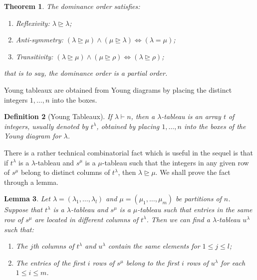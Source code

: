\documentclass{assignment}[2019/10/15]
\theoremstyle{plain}
\newtheorem{theorem}{Theorem}[section]
\newtheorem{definition}[theorem]{Definition}
\newtheorem{lemma}[theorem]{Lemma}
\numberwithin{equation}{section}
\begin{document}
    \begin{theorem}
        The dominance order satisfies:
        \begin{enumerate}
            \item Reflexivity: $\lambda\unrhd\lambda$;
            \item Anti-symmetry: $(\lambda\unrhd\mu)\wedge(\mu\unrhd\lambda)\Leftrightarrow(\lambda=\mu)$;
            \item Transitivity: $(\lambda\unrhd\mu)\wedge(\mu\unrhd\rho)\Leftrightarrow(\lambda\unrhd\rho)$;
        \end{enumerate}
        that is to say, the dominance order is a partial order.
    \end{theorem}

    Young tableaux are obtained from Young diagrams by placing the distinct integers $1, \dotsc, n$ into the boxes.

    \begin{definition}[Young Tableaux]
        If $\lambda\vdash n$, then a $\lambda$-\emph{tableau} is an array $t$ of integers, usually denoted by $t^\lambda$, obtained by placing $1, \dotsc, n$ into the boxes of the Young diagram for $\lambda$.
    \end{definition}

    There is a rather technical combinatorial fact which is useful in the sequel is that if $t^\lambda$ is a $\lambda$-tableau and $s^\mu$ is a $\mu$-tableau such that the integers in any given row of $s^\mu$ belong to distinct columns of $t^\lambda$, then $\lambda\unrhd\mu$. We shall prove the fact through a lemma.

    \begin{lemma}\label{lem: tableaux}
        Let $\lambda = (\lambda_1, \dotsc, \lambda_l)$ and $\mu = (\mu_1, \dotsc, \mu_m)$ be partitions of $n$. Suppose that $t^\lambda$ is a $\lambda$-tableau and $s^\mu$ is a $\mu$-tableau such that entries in the same row of $s^\mu$ are located in different columns of $t^\lambda$. Then we can find a $\lambda$-tableau $u^\lambda$ such that:
        \begin{enumerate}
            \item The $j$th columns of $t^\lambda$ and $u^\lambda$ contain the same elements for $1\leq j \leq l$;
            \item The entries of the first $i$ rows of $s^\mu$ belong to the first $i$ rows of $u^\lambda$ for each $1\leq i \leq m$.
        \end{enumerate}
    \end{lemma}
\end{document}
